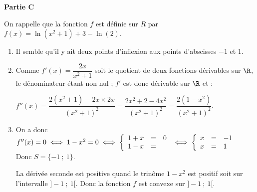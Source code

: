 \bigskip

\textbf{Partie C}

\medskip

On rappelle que la fonction $f$ est définie sur $R$ par $f(x) = \ln \left(x^2 + 1\right) + 3 - \ln (2)$.

\medskip

\begin{enumerate}
\item 

Il semble qu'il y ait deux points d'inflexion aux points d'abscisses $- 1$ et 1.
\item 
Comme $f'(x) = \dfrac{2x}{x^2 + 1}$ soit le quotient de deux fonctions dérivables sur $\R$, le dénominateur étant non nul ; $f'$ est donc dérivable sur $\R$ et :

$f''(x) = \dfrac{2\left(x^2 + 1\right) - 2x \times 2x}{\left(x^2 + 1\right)^2} = \dfrac{2x^2 + 2 - 4x^2}{\left(x^2 + 1\right)^2} = \dfrac{2\left(1 - x^2\right)}{\left(x^2 + 1\right)^2}$.
\item 
On a donc $f''(x) = 0 \iff 1 - x^2 = 0 \iff \left\{\begin{array}{l c  l}
1 +x&=&0\\
1 - x&=&
\end{array}\right.\iff \left\{\begin{array}{l c l}
x&=&- 1\\
x&=&1
\end{array}\right.$ Donc $S = \{-1~;~1\}$.

La dérivée seconde est positive quand le trinôme $1 - x^2$ est positif soit sur l'intervalle $]-1~;~1[$. Donc la fonction $f$ est convexe sur $]-1~;~1[$.
\end{enumerate}
